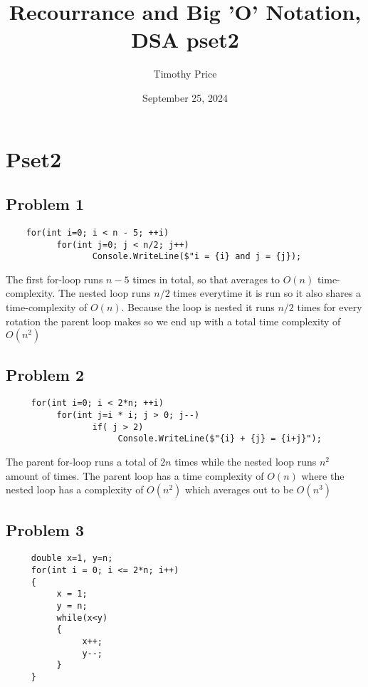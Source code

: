 \documentclass{article}
\title{Recourrance and Big 'O' Notation, DSA pset2}
\author{Timothy Price}
\date{September 25, 2024}
\begin{document}
\maketitle

\section{Pset2}

\subsection{Problem 1}

\begin{lstlisting}
    for(int i=0; i < n - 5; ++i) 
          for(int j=0; j < n/2; j++)
                 Console.WriteLine($"i = {i} and j = {j}); 
\end{lstlisting}

The first for-loop runs $n-5$ times in total, so that averages to $O(n)$ time-complexity.
The nested loop runs $n/2$ times everytime it is run so it also shares a time-complexity of $O(n)$.
Because the loop is nested it runs $n/2$ times for every rotation the parent loop makes so we end up
with a total time complexity of $O(n^2)$


\subsection{Problem 2}

\begin{lstlisting}
     for(int i=0; i < 2*n; ++i) 
          for(int j=i * i; j > 0; j--)
                 if( j > 2)
                      Console.WriteLine($"{i} + {j} = {i+j}");
\end{lstlisting}

The parent for-loop runs a total of $2n$ times while the nested loop runs $n^2$ amount of times.
The parent loop has a time complexity of $O(n)$ where the nested loop has a complexity of $O(n^2)$
which averages out to be $O(n^3)$

\subsection{Problem 3}

\begin{lstlisting}
     double x=1, y=n;
     for(int i = 0; i <= 2*n; i++)
     {
          x = 1;
          y = n;
          while(x<y)
          {
               x++;
               y--;
          }
     } 
\end{lstlisting}
\end{document}
